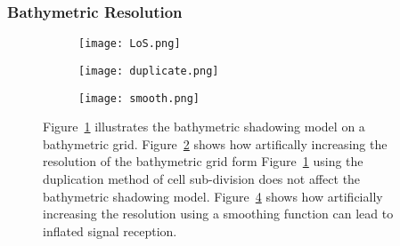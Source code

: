 \subsubsection{Bathymetric Resolution}
\begin{figure}
	\label{resolutionScale}
	\begin{subfigure}[t]{.4\textwidth}
		\centering
		\texttt{[image: LoS.png]}
		\caption{}\label{LoS}
	\end{subfigure}
	\begin{subfigure}[t]{.4\textwidth}
		\centering
		\texttt{[image: duplicate.png]}
		\caption{}\label{duplicate}
		
	\end{subfigure}
	
	\begin{subfigure}[t]{.4\textwidth}
		\centering
		\texttt{[image: smooth.png]}
		\caption{}\label{smooth}
	\end{subfigure}
	\caption{Figure~\ref{LoS} illustrates the bathymetric shadowing model on a bathymetric grid.  Figure~\ref{duplicate} shows how artifically increasing the resolution of the bathymetric grid form Figure~\ref{LoS} using the duplication method of cell sub-division does not affect the bathymetric shadowing model.  Figure~\ref{smooth} shows how artificially increasing the resolution using a smoothing function can lead to inflated signal reception.}
\end{figure}
